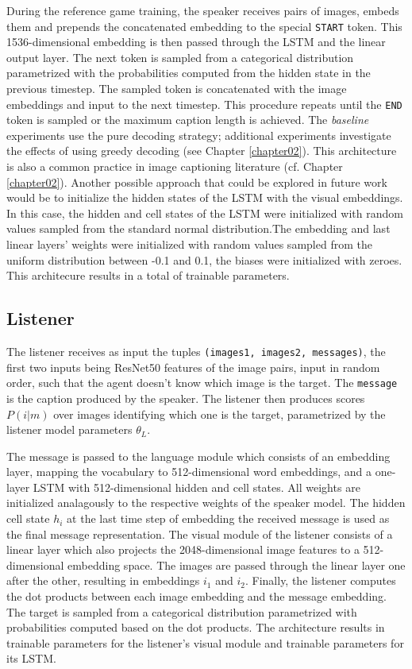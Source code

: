 During the reference game training, the speaker receives pairs of images, embeds them and prepends the concatenated embedding to the special \texttt{START} token. This 1536-dimensional embedding is then passed through the LSTM and the linear output layer. The next token is sampled from a categorical distribution parametrized with the probabilities computed from the hidden state in the previous timestep. The sampled token is concatenated with the image embeddings and input to the next timestep. This procedure repeats until the \texttt{END} token is sampled or the maximum caption length is achieved. The \textit{baseline} experiments use the pure decoding strategy; additional experiments investigate the effects of using greedy decoding (see Chapter \ref{chapter02}). This architecture is also a common practice in image captioning literature (cf. Chapter \ref{chapter02}). Another possible approach that could be explored in future work would be to initialize the hidden states of the LSTM with the visual embeddings. In this case, the hidden and cell states of the LSTM were initialized with random values sampled from the standard normal distribution.The embedding and last linear layers' weights were initialized with random values sampled from the uniform distribution between -0.1 and 0.1, the biases were initialized with zeroes.  
This architecure results in a total of  trainable parameters.  %

\subsection{Listener}
The listener receives as input the tuples \texttt{(images1, images2, messages)}, the first two inputs being ResNet50 features of the image pairs, input in random order, such that the agent doesn't know which image is the target. The \texttt{message} is the caption produced by the speaker. The listener then produces scores $P(i|m)$ over images identifying which one is the target, parametrized by the listener model parameters $\theta_L$.

The message is passed to the language module which consists of an embedding layer, mapping the vocabulary to 512-dimensional word embeddings, and a one-layer LSTM with 512-dimensional hidden and cell states. All weights are initialized analagously to the respective weights of the speaker model. The hidden cell state $h_i$ at the last time step of embedding the received message is used as the final message representation. 
The visual module of the listener consists of a linear layer which also projects the 2048-dimensional image features to a 512-dimensional embedding space. The images are passed through the linear layer one after the other, resulting in embeddings $i_1$ and $i_2$. Finally, the listener computes the dot products between each image embedding and the message embedding. The target is sampled from a categorical distribution parametrized with probabilities computed based on the dot products.  
The architecture results in  trainable parameters for the listener's visual module and  trainable parameters for its LSTM.


